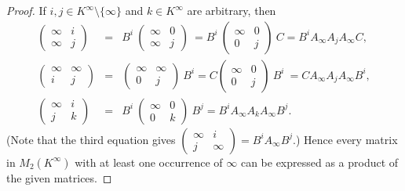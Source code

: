 \documentclass{amsart}
\newcommand{\tmat}[4]{\left(\begin{smallmatrix}#1&#2\\#3&#4\end{smallmatrix}\right)}
\numberwithin{equation}{section}
\theoremstyle{definition}
\begin{document}
\begin{proof}
  If $i, j\in K^{\infty}\setminus\{\infty\}$ and $k\in K^{\infty}$ are
  arbitrary, then 
  \begin{eqnarray*}
    \begin{pmatrix}
      \infty & i \\
      \infty & j
    \end{pmatrix}
    & = &
    B ^ i\ 
    \begin{pmatrix}
      \infty & 0 \\
      \infty & j
    \end{pmatrix}\ 
    = 
    B ^ i\ 
    \begin{pmatrix}
      \infty & 0 \\
      0      & j
    \end{pmatrix}\ 
    C
    = 
    B ^ i A_{\infty} A_j A_{\infty} C,
    \\
    \begin{pmatrix}
      \infty & \infty \\
      i      & j
    \end{pmatrix}
    & = &
    \begin{pmatrix}
      \infty & \infty \\
      0      & j
    \end{pmatrix}\ 
    B ^ i
    = 
    C
    \begin{pmatrix}
      \infty & 0 \\
      0      & j
    \end{pmatrix}\ 
    B ^ i\ 
    = 
    C A_{\infty} A_j A_{\infty} B ^ i,\\
    \begin{pmatrix}
      \infty & i \\
      j      & k
    \end{pmatrix}
    & = &
    B ^ i\ 
    \begin{pmatrix}
      \infty & 0 \\
      0      & k
    \end{pmatrix}\ 
    B ^ j
    = 
    B ^ i A_{\infty} A_k A_{\infty} B ^ j.
  \end{eqnarray*}
  (Note that the third equation gives $\tmat\infty i j \infty=B^iA_\infty
  B^j$.) Hence every matrix in $M_2(K^{\infty})$ with at least one occurrence
  of $\infty$ can be expressed as a product of the given matrices.


\end{proof}
\end{document}
